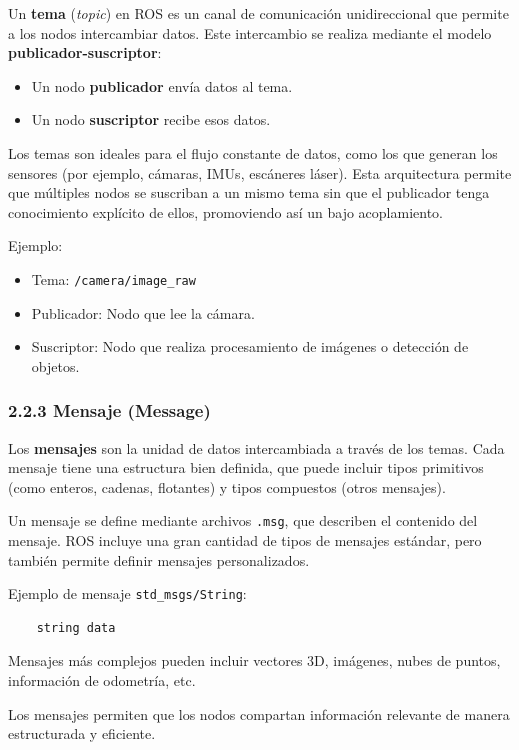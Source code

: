 Un \textbf{tema} (\textit{topic}) en ROS es un canal de comunicación unidireccional que permite a los nodos intercambiar datos. Este intercambio se realiza mediante el modelo \textbf{publicador-suscriptor}:

\begin{itemize}
	\item Un nodo \textbf{publicador} envía datos al tema.
	\item Un nodo \textbf{suscriptor} recibe esos datos.
\end{itemize}

Los temas son ideales para el flujo constante de datos, como los que generan los sensores (por ejemplo, cámaras, IMUs, escáneres láser). Esta arquitectura permite que múltiples nodos se suscriban a un mismo tema sin que el publicador tenga conocimiento explícito de ellos, promoviendo así un bajo acoplamiento.

Ejemplo:
\begin{itemize}
	\item Tema: \texttt{/camera/image\_raw}
	\item Publicador: Nodo que lee la cámara.
	\item Suscriptor: Nodo que realiza procesamiento de imágenes o detección de objetos.
\end{itemize}

\subsubsection{2.2.3 Mensaje (Message)}

Los \textbf{mensajes} son la unidad de datos intercambiada a través de los temas. Cada mensaje tiene una estructura bien definida, que puede incluir tipos primitivos (como enteros, cadenas, flotantes) y tipos compuestos (otros mensajes).

Un mensaje se define mediante archivos \texttt{.msg}, que describen el contenido del mensaje. ROS incluye una gran cantidad de tipos de mensajes estándar, pero también permite definir mensajes personalizados.

Ejemplo de mensaje \texttt{std\_msgs/String}:
\begin{verbatim}
	string data
\end{verbatim}

Mensajes más complejos pueden incluir vectores 3D, imágenes, nubes de puntos, información de odometría, etc.

Los mensajes permiten que los nodos compartan información relevante de manera estructurada y eficiente.

